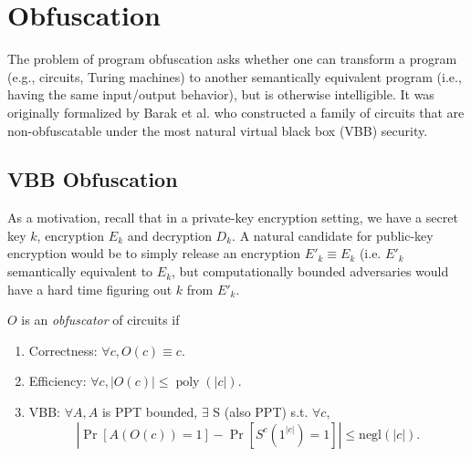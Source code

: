 
\newcommand{\norm}[1]{\left\Vert#1\right\Vert}
\newcommand{\ABS}[1]{\left\vert#1\right\vert}
\newcommand{\SET}[1]{\left\{#1\right\}}  
\newcommand{\INP}[1]{\left(#1\right)}
\newcommand{\POLY}[1]{\ensuremath{\mathop{\mathrm{poly}}\INP{#1}}}
\newcommand{\IO}[1]{\ensuremath{\mathop{i\mathcal{O}}\INP{#1}}}
\newcommand{\ENC}[1]{\ensuremath{\mathop{\mathrm{Enc}}\INP{#1}}}
\newcommand{\DEC}[1]{\ensuremath{\mathop{\mathrm{Dec}}\INP{#1}}}
%

\chapter{Obfuscation}
The problem of program obfuscation asks whether one can transform a program (e.g., circuits, Turing machines) to another semantically equivalent program (i.e., having the same input/output behavior), but is otherwise intelligible.
It was originally formalized by Barak et al. who constructed a family of circuits that are non-obfuscatable under the most natural virtual black box (VBB) security.
\section{VBB Obfuscation}
As a motivation, recall that in a private-key encryption setting, we have a secret key $k$, encryption $E_k$ and decryption $D_k$.
A natural candidate for public-key encryption would be to simply release an encryption $E'_k \equiv E_k$ (i.e. $E'_k$ semantically equivalent to $E_k$, but computationally bounded adversaries would have a hard time figuring out $k$ from $E'_k$.

\begin{definition}
	$O$ is an \emph{obfuscator} of circuits if %
	\begin{enumerate}
		\item
			Correctness:
	$\forall c, O(c) \equiv c$.
	\item
		Efficiency:
		$\forall c, \ABS{O(c)} \le \POLY{\ABS{c}}$.
	\item
		VBB:
		$\forall A, A$ is PPT bounded, $\exists$ S (also PPT) s.t. $\forall c$,
		\[
			\ABS{\Pr\left[ A\left( O(c) \right) = 1\right] - \Pr\left[ S^c(1^{\ABS{c}}) = 1 \right]} \le \mathrm{negl}(\ABS{c}).
		\]
	\end{enumerate}
\end{definition}

